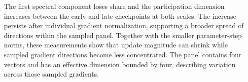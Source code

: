 The first spectral component loses share and the participation dimension increases between the early and late checkpoints at both scales. The increase persists after individual gradient normalization, supporting a broader spread of directions within the sampled panel. Together with the smaller parameter-step norms, these measurements show that update magnitude can shrink while sampled gradient directions become less concentrated. The panel contains four vectors and has an effective dimension bounded by four, describing variation across those sampled gradients.



